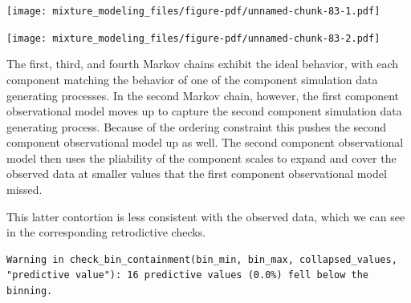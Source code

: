 \documentclass[
  letterpaper,
  DIV=11,
  numbers=noendperiod]{scrartcl}
\newenvironment{Shaded}{\begin{snugshade}}{\end{snugshade}}
\newcommand{\AttributeTok}[1]{\textcolor[rgb]{0.40,0.45,0.13}{#1}}
\newcommand{\ControlFlowTok}[1]{\textcolor[rgb]{0.00,0.23,0.31}{#1}}
\newcommand{\DecValTok}[1]{\textcolor[rgb]{0.68,0.00,0.00}{#1}}
\newcommand{\FloatTok}[1]{\textcolor[rgb]{0.68,0.00,0.00}{#1}}
\newcommand{\FunctionTok}[1]{\textcolor[rgb]{0.28,0.35,0.67}{#1}}
\newcommand{\NormalTok}[1]{\textcolor[rgb]{0.00,0.23,0.31}{#1}}
\newcommand{\OtherTok}[1]{\textcolor[rgb]{0.00,0.23,0.31}{#1}}
\newcommand{\SpecialCharTok}[1]{\textcolor[rgb]{0.37,0.37,0.37}{#1}}
\newcommand{\StringTok}[1]{\textcolor[rgb]{0.13,0.47,0.30}{#1}}
\begin{document}
\texttt{[image: mixture\_modeling\_files/figure-pdf/unnamed-chunk-83-1.pdf]}

\texttt{[image: mixture\_modeling\_files/figure-pdf/unnamed-chunk-83-2.pdf]}

The first, third, and fourth Markov chains exhibit the ideal behavior,
with each component matching the behavior of one of the component
simulation data generating processes. In the second Markov chain,
however, the first component observational model moves up to capture the
second component simulation data generating process. Because of the
ordering constraint this pushes the second component observational model
up as well. The second component observational model then uses the
pliability of the component scales to expand and cover the observed data
at smaller values that the first component observational model missed.

This latter contortion is less consistent with the observed data, which
we can see in the corresponding retrodictive checks.

\begin{Shaded}
\end{Shaded}

\begin{verbatim}
Warning in check_bin_containment(bin_min, bin_max, collapsed_values,
"predictive value"): 16 predictive values (0.0%) fell below the binning.
\end{verbatim}
\end{document}
